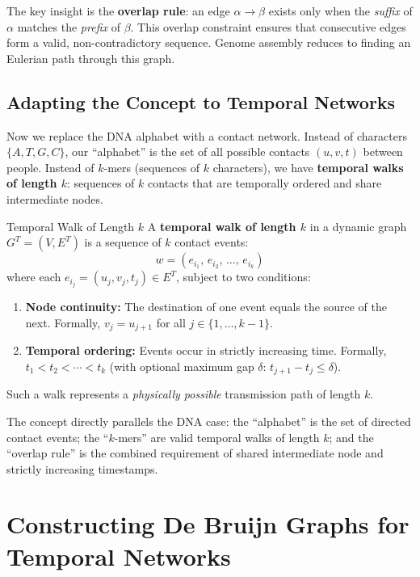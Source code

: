 The key insight is the \textbf{overlap rule}: an edge $\alpha \to \beta$ exists only when the
\emph{suffix} of $\alpha$ matches the \emph{prefix} of $\beta$. This overlap constraint ensures
that consecutive edges form a valid, non-contradictory sequence. Genome assembly reduces to
finding an Eulerian path through this graph.

\subsection{Adapting the Concept to Temporal Networks}

Now we replace the DNA alphabet with a contact network. Instead of characters $\{A, T, G, C\}$,
our ``alphabet'' is the set of all possible contacts $(u, v, t)$ between people. Instead of
$k$-mers (sequences of $k$ characters), we have \textbf{temporal walks of length $k$}: sequences
of $k$ contacts that are temporally ordered and share intermediate nodes.

\begin{conceptbox}{Temporal Walk of Length $k$}
A \textbf{temporal walk of length $k$} in a dynamic graph $G^T = (V, E^T)$ is a sequence of
$k$ contact events:
\[ w = (e_{i_1},\, e_{i_2},\, \ldots,\, e_{i_k}) \]
where each $e_{i_j} = (u_j, v_j, t_j) \in E^T$, subject to two conditions:
\begin{enumerate}[noitemsep]
    \item \textbf{Node continuity:} The destination of one event equals the source of the next.
          Formally, $v_j = u_{j+1}$ for all $j \in \{1, \ldots, k-1\}$.
    \item \textbf{Temporal ordering:} Events occur in strictly increasing time.
          Formally, $t_1 < t_2 < \cdots < t_k$ (with optional maximum gap $\delta$:
          $t_{j+1} - t_j \leq \delta$).
\end{enumerate}
Such a walk represents a \emph{physically possible} transmission path of length $k$.
\end{conceptbox}

The concept directly parallels the DNA case: the ``alphabet'' is the set of directed contact
events; the ``$k$-mers'' are valid temporal walks of length $k$; and the ``overlap rule'' is
the combined requirement of shared intermediate node and strictly increasing timestamps.

\section{Constructing De Bruijn Graphs for Temporal Networks}

